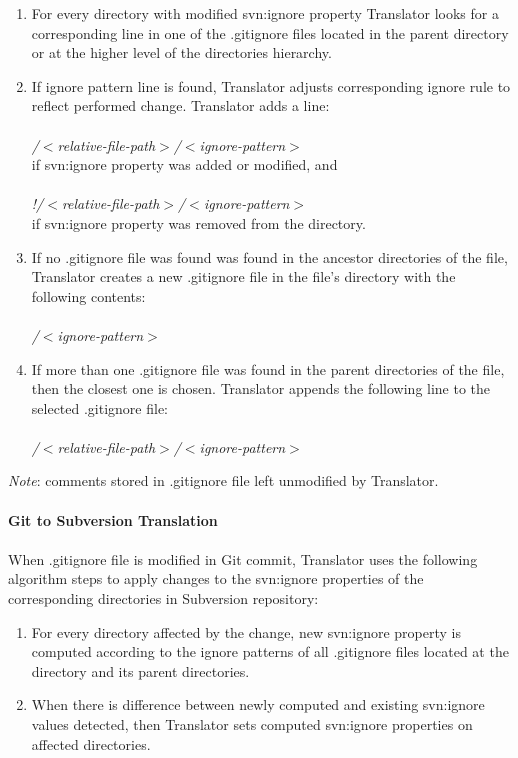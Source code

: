 \begin{enumerate}
\compactlist
\item For every directory with modified svn:ignore property Translator looks for a corresponding line in one of the 
.gitignore files located in the parent directory or at the higher level of the directories hierarchy.\\
\item If ignore pattern line is found, Translator adjusts corresponding ignore rule to reflect performed change. 
Translator adds a line:\\\\
\emph{/$<$relative-file-path$>$/$<$ignore-pattern$>$}\\
if svn:ignore property was added or modified, and \\\\
\emph{!/$<$relative-file-path$>$/$<$ignore-pattern$>$}\\
if svn:ignore property was removed from the directory.\\
\item If no .gitignore file was found was found in the ancestor directories of the file, Translator creates a new .gitignore file in the file's directory with the following contents:\\\\
\emph{/$<$ignore-pattern$>$}\\
\item 
If more than one .gitignore file was found in the parent directories of the file, then the closest one is chosen. 
Translator appends the following line to the selected .gitignore file:\\\\
\emph{/$<$relative-file-path$>$/$<$ignore-pattern$>$}\\
\end{enumerate}
\emph{Note}: comments stored in .gitignore file left unmodified by Translator.\\
\\
\textbf{Git to Subversion Translation}
\\\\
When .gitignore file is modified in Git commit, Translator uses the following algorithm steps to apply changes to the svn:ignore properties of the corresponding directories in Subversion repository:

\begin{enumerate}
\compactlist
\item For every directory affected by the change, new svn:ignore property is computed according to the ignore patterns of all .gitignore files located at the directory and its parent directories.\\
\item When there is difference between newly computed and existing svn:ignore values detected, then Translator sets computed svn:ignore properties on affected directories.\\
\end{enumerate}
